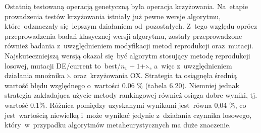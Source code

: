 Ostatnią testowaną operacją genetyczną była operacja krzyżowania. Na~etapie prowadzenia testów krzyżowania istniały już pewne wersje algorytmu, które~odznaczały się~lepszym działaniem od~pozostałych. Z~tego względu oprócz przeprowadzenia badań klasycznej wersji algorytmu, zostały przeprowadzone również badania z~uwzględnieniem modyfikacji metod reprodukcji oraz~mutacji. Najskuteczniejszą wersją okazał się~być algorytm stosujący metodę reprodukcji losowej, mutacji DE/current to~best/$n_{v}+1$+$\leftthreetimes$, a~więc z~uwzględnieniem działania mnożnika $\leftthreetimes$ oraz~krzyżowania OX. Strategia ta osiągnęła średnią wartość błędu względnego o~wartości 0.06 \% (tabela 6.20). Niemniej jednak strategia zakładająca użycie metody rankingowej również osiąga dobre wyniki, tj. wartość 0.1\%. Różnica pomiędzy uzyskanymi wynikami jest~równa 0,04 \%, co jest~wartością niewielką i~może wynikać jedynie z~działania czynnika losowego, który~w~przypadku algorytmów metaheurystycznych ma duże znaczenie.\\

